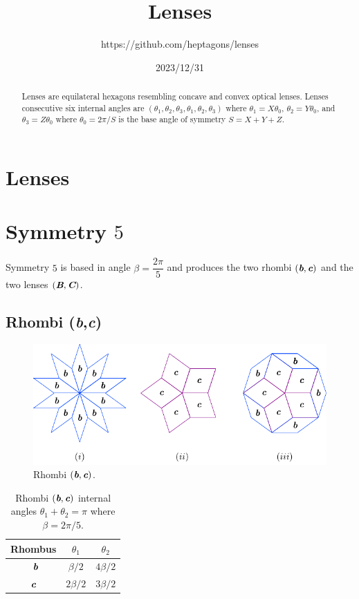 \documentclass[11pt]{article}
\title{Lenses}
\author{https://github.com/heptagons/lenses}
\date{2023/12/31}
\def\mathbi#1{\textbf{\em #1}}
\begin{document}
\maketitle
\begin{abstract}
Lenses are equilateral hexagons resembling concave and convex optical lenses. Lenses consecutive six internal angles are $(\theta_1,\theta_2,\theta_3,\theta_1,\theta_2,\theta_3)$ where $\theta_1=X\theta_0$, $\theta_2=Y\theta_0$, and $\theta_3=Z\theta_0$ where $\theta_0 = 2\pi/S$ is the base angle of symmetry $S = X + Y + Z$.
\end{abstract}

\section{Lenses}

\section{Symmetry $5$}

Symmetry $5$ is based in angle $\beta = \dfrac{2\pi}5$ and produces the two rhombi $(\mathbi{b},\mathbi{c})$ and the two lenses $(\mathbi{B},\mathbi{C})$.


\subsection{Rhombi (\mathbi{b},\mathbi{c})}

\begin{figure}[H]
\centering
\includegraphics[scale=1.1]{bc/rhombi}
\caption{Rhombi $(\mathbi{b},\mathbi{c})$.}
\label{fig:bc-rhombi}
\end{figure}

\begin{table}[H]
\begin{center}
\begin{tabular}{|c|c c|}
\hline
Rhombus & $\theta_1$ & $\theta_2$ \\ %
\hline\
$\mathbi{b}$ & $\beta/2$ & $4\beta/2$ \\[0.5ex] \hline
$\mathbi{c}$ & $2\beta/2$ & $3\beta/2$ \\[0.5ex] \hline
\end{tabular}
\caption{Rhombi $(\mathbi{b},\mathbi{c})$ internal angles $\theta_1 + \theta_2 = \pi$ where $\beta = 2\pi/5$.} 
\label{tbl:bc-angles}
\end{center}
\end{table}
\end{document}
